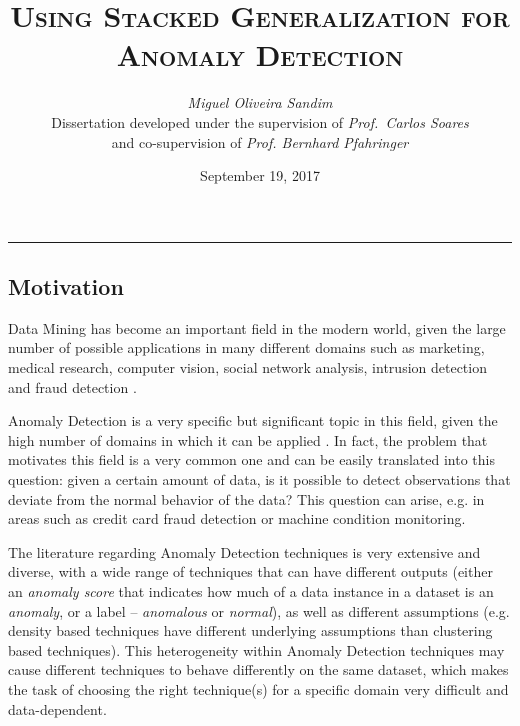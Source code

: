 \documentclass[9pt,a4paper]{extarticle}
\begin{document}
\title{\vspace*{-8mm}\textbf{\textsc{Using Stacked Generalization for Anomaly Detection}}}
\author{\emph{Miguel Oliveira Sandim}\\[2mm]
\small{Dissertation developed under the supervision of \emph{Prof.\ Carlos Soares}}\\
\small{and co-supervision of \emph{Prof. Bernhard Pfahringer}}}
\date{September 19, 2017}
\maketitle
\thispagestyle{empty}

\vspace*{-4mm}\noindent\rule{\textwidth}{0.4pt}\vspace*{4mm}

\begin{multicols}{2}

\section{Motivation}\label{sec:motiva}

Data Mining has become an important field in the modern world, given the large number of possible applications in many different domains such as marketing, medical research, computer vision, social network analysis, intrusion detection and fraud detection \cite{Aggarwal:2015:DMT:2778285}.

Anomaly Detection is a very specific but significant topic in this field, given the high number of domains in which it can be applied \cite{Kandhari2009}. In fact, the problem that motivates this field is a very common one and can be easily translated into this question: given a certain amount of data, is it possible to detect observations that deviate from the normal behavior of the data?
This question can arise, e.g. in areas such as credit card fraud detection or machine condition monitoring.

The literature regarding Anomaly Detection techniques is very extensive and diverse, with a wide range of techniques that can have different outputs (either an \textit{anomaly score} that indicates how much of a data instance in a dataset is an \textit{anomaly}, or a label -- \textit{anomalous} or \textit{normal}), as well as different assumptions (e.g. density based techniques have different underlying assumptions than clustering based techniques).
This heterogeneity within Anomaly Detection techniques may cause different techniques to behave differently on the same dataset, which makes the task of choosing the right technique(s) for a specific domain very difficult and data-dependent.


\end{multicols}
\end{document}

